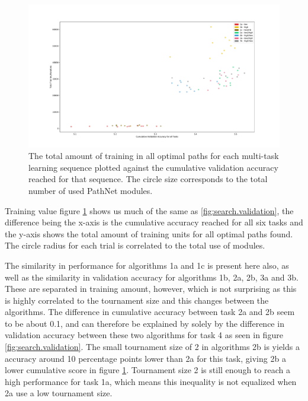 \begin{figure}
    \includegraphics[width=1.2\textwidth,center]{Chapters/4.Experiments/exp2/figures/large/Training_value.pdf}
    \caption{The total amount of training in all optimal paths for each multi-task learning sequence plotted against the cumulative validation accuracy reached for that sequence. The circle size corresponds to the total number of used PathNet modules.}
    \label{fig:search.training_value}
\end{figure}

Training value figure \ref{fig:search.training_value} shows us much of the same as \ref{fig:search.validation}, the difference being the x-axis is the cumulative accuracy reached for all six tasks and the y-axis shows the total amount of training units for all optimal paths found. The circle radius for each trial is correlated to the total use of modules. 

The similarity in performance for algorithms 1a and 1c is present here also, as well as the similarity in validation accuracy for algorithms 1b, 2a, 2b, 3a and 3b. These are separated in training amount, however, which is not surprising as this is highly correlated to the tournament size and this changes between the algorithms. The difference in cumulative accuracy between task 2a and 2b seem to be about 0.1, and can therefore be explained by solely by the difference in validation accuracy between these two algorithms for task 4 as seen in figure \ref{fig:search.validation}. The small tournament size of 2 in algorithms 2b is yields a accuracy around 10 percentage points lower than 2a for this task, giving 2b a lower cumulative score in figure \ref{fig:search.training_value}. Tournament size 2 is still enough to reach a high performance for task 1a, which means this inequality is not equalized when 2a use a low tournament size. 

